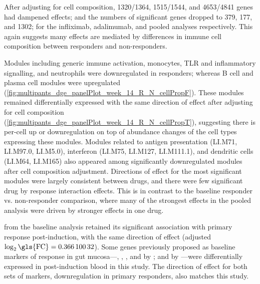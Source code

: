 After adjusting for cell composition, 1320/1364, 1515/1544, and 4653/4841 genes had dampened effects;
and the numbers of significant genes dropped to 379, 177, and 1302; for the infliximab, adalimumab, and pooled analyses respectively.
This again suggests many effects are mediated by differences in immune cell composition between responders and non-responders.

Modules including generic immune activation, monocytes, TLR and inflammatory signalling, and neutrophils were downregulated in responders; 
whereas B cell and plasma cell modules were upregulated (\cref{fig:multipants_dge_panelPlot_week_14_R_N_cellPropF}).
These modules remained differentially expressed with the same direction of effect after adjusting for cell composition (\cref{fig:multipants_dge_panelPlot_week_14_R_N_cellPropT}), 
suggesting there is per-cell up or downregulation on top of abundance changes of the cell types expressing these modules.
Modules related to antigen presentation (LI.M71, LI.M97.0, LI.M5.0),
interferon (LI.M75, LI.M127, LI.M111.1),
and dendritic cells (LI.M64, LI.M165)
also appeared among significantly downregulated modules after cell composition adjustment.
Directions of effect for the most significant modules were largely consistent between drugs, 
and there were few significant drug by response interaction effects.
This is in contrast to the baseline responder vs. non-responder comparison,
where many of the strongest effects in the pooled analysis were driven by stronger effects in one drug.

 from the baseline analysis retained its significant association with primary response post-induction, 
with the same direction of effect (adjusted $\log_2\text{\gls{FC}} = \num{0.36610032}$).
Some genes previously proposed as baseline markers of response in gut mucosa---, , , and  by \textcite{arijs2010PredictiveValueEpithelial}; and  by \textcite{west2017OncostatinDrivesIntestinal}---were differentially expressed in post-induction blood in this study.
The direction of effect for both sets of markers, downregulation in primary responders, also matches this study.

